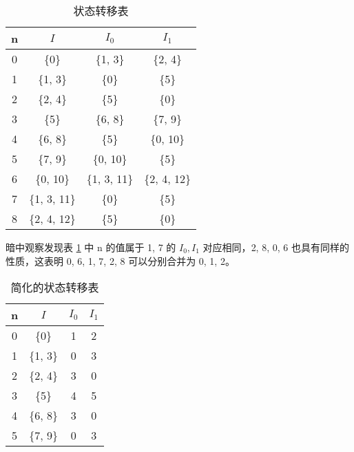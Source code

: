 \documentclass{ctexart}
\begin{document}
\begin{enumerate}
\begin{itemize}
        \begin{table}[H]
            \centering
            \begin{tabular}{|c|c|c|c|}
                \hline
                n & $I$ & $I_0$ & $I_1$ \\
                \hline
                0 & \{0\} & \{1, 3\} & \{2, 4\} \\
                \hline
                1 & \{1, 3\} & \{0\} & \{5\} \\
                \hline
                2 & \{2, 4\} & \{5\} & \{0\} \\
                \hline
                3 & \{5\} & \{6, 8\} & \{7, 9\} \\
                \hline
                4 & \{6, 8\} & \{5\} & \{0, 10\} \\
                \hline
                5 & \{7, 9\} & \{0, 10\} & \{5\} \\
                \hline
                6 & \{0, 10\} & \{1, 3, 11\} & \{2, 4, 12\} \\
                \hline
                7 & \{1, 3, 11\} & \{0\} & \{5\} \\
                \hline
                8 & \{2, 4, 12\} & \{5\} & \{0\} \\
                \hline
            \end{tabular}
            \caption{状态转移表}
            \label{tab:4}
        \end{table}
        
        暗中观察发现表 \ref{tab:4} 中 n 的值属于 {1, 7} 的 $I_0, I_1$ 对应相同，{2, 8}, {0, 6} 也具有同样的性质，这表明 {0, 6}, {1, 7}, {2, 8} 可以分别合并为 0, 1, 2。
        
        \begin{table}[H]
            \centering
            \begin{tabular}{|c|c|c|c|}
                \hline
                n & $I$ & $I_0$ & $I_1$ \\
                \hline
                0 & \{0\} & 1 & 2 \\
                \hline
                1 & \{1, 3\} & 0 & 3 \\
                \hline
                2 & \{2, 4\} & 3 & 0 \\
                \hline
                3 & \{5\} & 4 & 5 \\
                \hline
                4 & \{6, 8\} & 3 & 0 \\
                \hline
                5 & \{7, 9\} & 0 & 3 \\
                \hline
            \end{tabular}
            \caption{简化的状态转移表}
            \label{tab:4_1}
        \end{table}
        

\end{itemize}
\end{enumerate}
\end{document}
